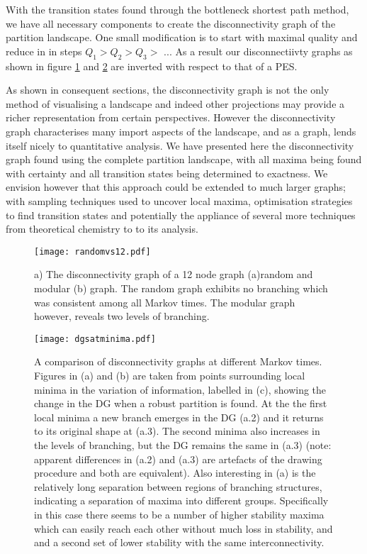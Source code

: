 With the transition states found through the bottleneck shortest path method, we have all necessary components to create the disconnectivity graph of the partition landscape.  One small modification is to start with maximal quality and reduce in in steps $Q_1 > Q_2 > Q_3 >$ ...    As a result our disconnectiivty graphs as shown in figure \ref{fig:randomvsnormaldg} and \ref{fig:differentdgs} are inverted with respect to that of a PES.

As shown in consequent sections, the disconnectivity graph is not the only method of visualising a landscape and indeed other projections may provide a richer representation from certain perspectives.  However the disconnectivity graph characterises many import aspects of the landscape, and as a graph, lends itself nicely to quantitative analysis.  We have presented here the disconnectivity graph found using the complete partition landscape, with all maxima being found with certainty and all transition states being determined to exactness.  We envision however that this approach could be extended to much larger graphs; with sampling techniques used to uncover local maxima, optimisation strategies to find transition states and potentially the appliance of several more techniques from theoretical chemistry to to its analysis.

\begin{figure}[h]
  \centering
  \texttt{[image: randomvs12.pdf]}
  \caption{a) The disconnectivity graph of a 12 node graph (a)random and modular (b) graph.  The random graph exhibits no branching which was consistent among all Markov times.  The modular graph however, reveals two levels of branching.}\label{fig:randomvsnormaldg}
\end{figure}

\begin{figure}[h]
  \centering
  \texttt{[image: dgsatminima.pdf]}
  \caption{A comparison of disconnectivity graphs at different Markov times.  Figures in (a) and (b) are taken from points surrounding local minima in the variation of information, labelled in (c), showing the change in the DG when a robust partition is found.  At the the first local minima a new branch emerges in the DG (a.2) and it returns to its original shape at (a.3).  The second minima also increases in the levels of branching, but the DG remains the same in (a.3) (note: apparent differences in (a.2) and (a.3) are artefacts of the drawing procedure and both are equivalent).  Also interesting in (a) is the relatively long separation between regions of branching structures, indicating a separation of maxima into different groups.  Specifically in this case there seems to be a number of higher stability maxima which can easily reach each other without much loss in stability, and and a second set of lower stability with the same interconnectivity.}\label{fig:differentdgs}
\end{figure}


